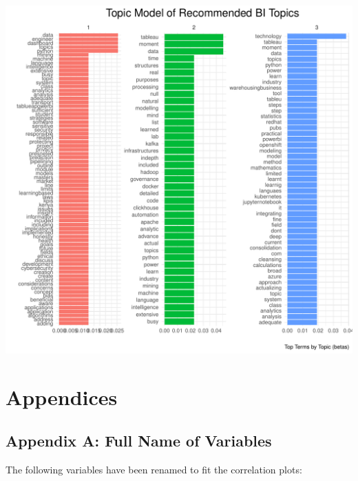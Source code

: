 \documentclass[
]{article}
\begin{document}
\includegraphics{10.b.BBT4206-End-SemesterCourseEvaluation-20230821-20231128-BI2-BBIT4-2_files/figure-latex/visualizations_for_recommended_topics_topic_modelling-1.pdf}

\newpage

\section{Appendices}\label{appendices}

\subsection{Appendix A: Full Name of
Variables}\label{appendix-a-full-name-of-variables}

The following variables have been renamed to fit the correlation plots:
\end{document}
